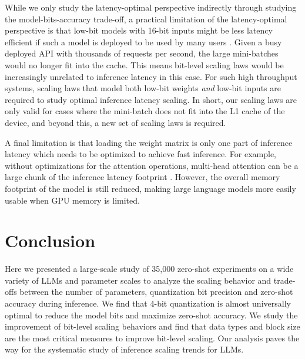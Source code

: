 While we only study the latency-optimal perspective indirectly through studying the model-bits-accuracy trade-off, a practical limitation of the latency-optimal perspective is that low-bit models with 16-bit inputs might be less latency efficient if such a model is deployed to be used by many users \citep{pope2022efficiently}. Given a busy deployed API with thousands of requests per second, the large mini-batches would no longer fit into the cache. This means bit-level scaling laws would be increasingly unrelated to inference latency in this case. For such high throughput systems, scaling laws that model both low-bit weights {\it and} low-bit inputs are required to study optimal inference latency scaling. In short, our scaling laws are only valid for cases where the mini-batch does not fit into the L1 cache of the device, and beyond this, a new set of scaling laws is required.

A final limitation is that loading the weight matrix is only one part of inference latency which needs to be optimized to achieve fast inference. For example, without optimizations for the attention operations, multi-head attention can be a large chunk of the inference latency footprint \citep{jaszczur2021sparse,pope2022efficiently}. However, the overall memory footprint of the model is still reduced, making large language models more easily usable when GPU memory is limited. 

\section{Conclusion}

Here we presented a large-scale study of 35,000 zero-shot experiments on a wide variety of LLMs and parameter scales to analyze the scaling behavior and trade-offs between the number of parameters, quantization bit precision and zero-shot accuracy during inference. We find that 4-bit quantization is almost universally optimal to reduce the model bits and maximize zero-shot accuracy. We study the improvement of bit-level scaling behaviors and find that data types and block size are the most critical measures to improve bit-level scaling. Our analysis paves the way for the systematic study of inference scaling trends for LLMs.


